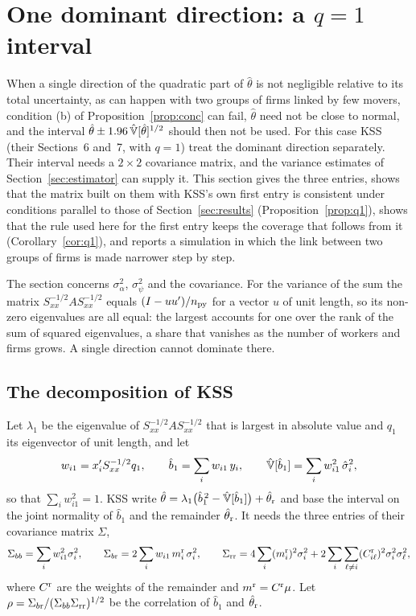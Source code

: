 \section{One dominant direction: a $q=1$ interval}\label{sec:q1}

When a single direction of the quadratic part of $\hat\theta$ is not negligible relative to its total
uncertainty, as can happen with two groups of firms linked by few movers, condition (b) of
Proposition~\ref{prop:conc} can fail, $\hat\theta$ need not be close to normal, and the interval
$\hat\theta\pm1.96\,\hat{\mathbb{V}}[\hat\theta]^{1/2}$ should then not be used. For this case KSS (their Sections~6 and~7,
with $q=1$) treat the dominant direction separately. Their interval needs a $2\times2$ covariance matrix, and
the variance estimates of Section~\ref{sec:estimator} can supply it. This section gives the three entries, shows
that the matrix built on them with KSS's own first entry is consistent under conditions parallel to those of
Section~\ref{sec:results} (Proposition~\ref{prop:q1}), shows that the rule used here for the first entry keeps
the coverage that follows from it (Corollary~\ref{cor:q1}), and reports a simulation in which the link between
two groups of firms is made narrower step by step.

The section concerns $\sigma^2_\alpha$, $\sigma^2_\psi$ and the covariance. For the variance of the sum the matrix
$S_{xx}^{-1/2}AS_{xx}^{-1/2}$ equals $(I-uu')/n_{\rm py}$ for a vector $u$ of unit length, so its non-zero
eigenvalues are all equal: the largest accounts for one over the rank of the sum of squared eigenvalues, a
share that vanishes as the number of workers and firms grows. A single direction cannot dominate there.

\subsection{The decomposition of KSS}

Let $\lambda_1$ be the eigenvalue of $S_{xx}^{-1/2}AS_{xx}^{-1/2}$ that is largest in absolute value and $q_1$ its
eigenvector of unit length, and let
\[
w_{i1}=x_i'S_{xx}^{-1/2}q_1,\qquad \hat b_1=\sum_iw_{i1}\,y_i,\qquad \hat{\mathbb{V}}[\hat b_1]=\sum_iw_{i1}^2\,\hat\sigma_i^2 ,
\]
so that $\sum_iw_{i1}^2=1$. KSS write
$\hat\theta=\lambda_1\big(\hat b_1^{\,2}-\hat{\mathbb{V}}[\hat b_1]\big)+\hat\theta_{\rm r}$
and base the interval on the joint normality of $\hat b_1$ and the remainder $\hat\theta_{\rm r}$. It needs the three
entries of their covariance matrix $\Sigma$,
\begin{equation}\label{eq:q1cov}
\Sigma_{bb}=\sum_iw_{i1}^2\sigma_i^2,\qquad
\Sigma_{b{\rm r}}=2\sum_iw_{i1}\,m_i^{\rm r}\,\sigma_i^2,\qquad
\Sigma_{\rm rr}=4\sum_i(m_i^{\rm r})^2\sigma_i^2+2\sum_i\sum_{\ell\ne i}(C_{i\ell}^{\rm r})^2\sigma_i^2\sigma_\ell^2 ,
\end{equation}
where $C^{\rm r}$ are the weights of the remainder and $m^{\rm r}=C^{\rm r}\mu$. Let
$\rho=\Sigma_{b{\rm r}}/(\Sigma_{bb}\Sigma_{\rm rr})^{1/2}$ be the correlation of $\hat b_1$ and $\hat\theta_{\rm r}$.

